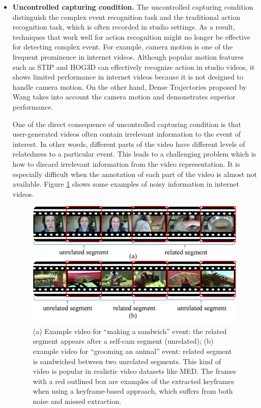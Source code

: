 \begin{itemize}
	\item{\textbf{Uncontrolled capturing condition.}} The uncontrolled capturing condition distinguish the complex event recognition task and the traditional action recognition task, which is often recorded in studio settings. As a result, techniques that work well for action recognition might no longer be effective for detecting complex event. For example, camera motion is one of the frequent prominence in internet videos. Although popular motion features  such as  STIP \cite{Laptev03space-timeinterest} and  HOG3D \cite{Klaser08BMVC} can effectively recognize action in studio videos, it shows limited performance in internet videos because it is not designed to handle camera motion. On the other hand, Dense Trajectories proposed by Wang takes into account the camera motion and demonstrates superior performance.
	 
	One of the direct consequence of uncontrolled capturing condition is that user-generated videos often contain irrelevant information to the event of interest. In other words, different parts of the video have different levels of relatedness to a particular event. This leads to a challenging problem which is how to discard irrelevant information from the video representation. It is especially difficult when the annotation of each part of the video is almost not available. Figure \ref{c1_uncontrolled} shows some examples of noisy information in internet videos.
	
	\begin{figure}
		\centering
		\includegraphics[width=1\textwidth]{teaser_image.png}
		\caption{(a) Example video for ``making a sandwich'' event: the related segment appears after a self-cam segment (unrelated); (b) example video for ``grooming an animal'' event: related segment is sandwiched between two unrelated segments. This kind of video is popular in realistic video datasets like MED. The frames with a red outlined box are examples of the extracted keyframes when using a keyframe-based approach, which suffers from both noise and missed extraction.}
		\label{c1_uncontrolled}
	\end{figure}
	 

\end{itemize}
